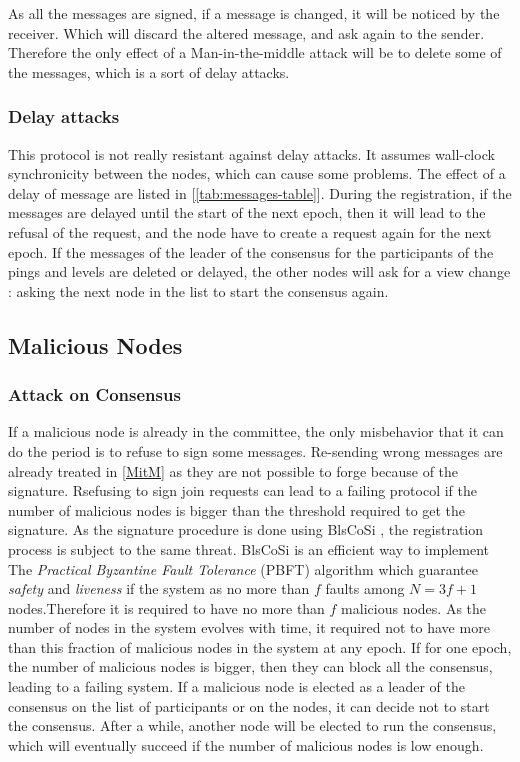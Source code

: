 \documentclass[a4paper,11pt,oneside]{report}
\begin{document}
As all the messages are signed, if a message is changed, it will be noticed by
the receiver. Which will discard the altered message, and ask again to the
sender.  Therefore the only effect of a Man-in-the-middle attack will be to
delete some of the messages, which is a sort of delay attacks. 

\subsubsection{Delay attacks}
This protocol is not really resistant against delay attacks. It assumes
wall-clock synchronicity between the nodes, which can cause some problems. The
effect of a delay of message are listed in [\autoref{tab:messages-table}]. During
the registration, if the messages are delayed until the start of the next
epoch, then it will lead to the refusal of the request, and the node have to
create a request again for the next epoch. If the messages of the leader of the
consensus for the participants of the pings and levels are deleted or delayed,
the other nodes will ask for a view change : asking the next node in the list
to start the consensus again.

\subsection{Malicious Nodes}
\subsubsection{Attack on Consensus}
If a malicious node is already in the committee, the only misbehavior that it
can do the period is to refuse to sign some messages. Re-sending wrong messages
are already treated in \autoref{MitM} as they are not possible to forge because
of the signature. Rsefusing to sign join requests can lead to a failing protocol
if the number of malicious nodes is bigger than the threshold required to get
the signature. As the signature procedure is done using BlsCoSi \cite{Boneh2018},
the registration process is subject to the same threat. BlsCoSi
\cite{Boneh2018} is an efficient way to implement The \textit{Practical
Byzantine Fault Tolerance} (PBFT) \cite{Castro1999} algorithm which guarantee
\textit{safety} and \textit{liveness} if the system as no more than $f$ faults
among $N = 3f+1$ nodes.Therefore it is required to have no more than $f$
malicious nodes. As the number of nodes in the system evolves
with time, it required not to have more than this fraction of malicious nodes
in the system at any epoch. If for one epoch, the number of malicious nodes is
bigger, then they can block all the consensus, leading to a failing system. 
If a malicious node is elected as a leader of the consensus on the list of
participants or on the nodes, it can decide not to start the consensus. After a
while, another node will be elected to run the consensus, which will eventually
succeed if the number of malicious nodes is low enough.
\end{document}
